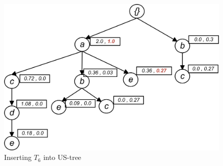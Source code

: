 \begin{figure}
  \centering
	\includegraphics[width=.6\textwidth]{images/sim_06.jpg}  
	\caption{Inserting $T_6$ into US-tree}
	\label{figure:t6}
\end{figure}

%